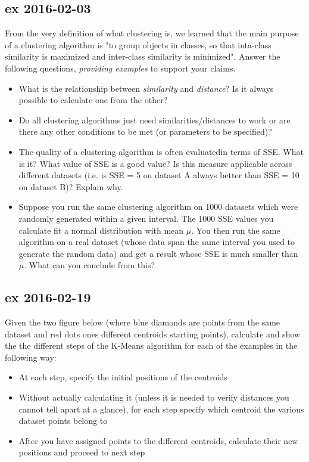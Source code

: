 \documentclass[a4paper,12pt,titlepage]{article} %
\begin{document}
\subsection{ex 2016-02-03}
From the very definition of what clustering is, we learned that the main purpose of a clustering algorithm is "to group objects in classes, so that inta-class similarity is maximized and inter-class similarity is minimized". Answer the following questions, \textit{providing examples} to support your claims.
\begin{itemize}
\item What is the relationship between \textit{similarity} and \textit{distance}? Is it always possible to calculate one from the other?
\item Do all clustering algorithms just need similarities/distances to work or are there any other conditions to be met (or parameters to be specified)?
\item The quality of a clustering algorithm is often evaluatedin terms of SSE. What is it? What value of SSE is a good value? Is this measure applicable across different datasets (i.e. is SSE = 5 on dataset A always better than SSE = 10 on dataset B)? Explain why.
\item Suppose you run the same clustering algorithm on 1000 datasets which were randomly generated within a given interval. The 1000 SSE values you calculate fit a normal distribution with mean $ \mu $. You then run the same algorithm on a real dataset (whose data span the same interval you used to generate the random data) and get a result whose SSE is much smaller than $ \mu $. What can you conclude from this?
\end{itemize}

\subsection{ex 2016-02-19}
Given the two figure below (where blue diamonds are points from the same dataset and red dots ones different centroids starting points), calculate and show the the different steps of the K-Means algorithm for each of the examples in the following way: 
\begin{itemize}
\item At each step, specify the initial positions of the centroids
\item Without actually calculating it (unless it is needed to verify distances you cannot tell apart at a glance), for each step specify which centroid the various dataset points belong to 
\item After you have assigned points to the different centroids, calculate their new positions and proceed to next step
\end{itemize}
\end{document}
